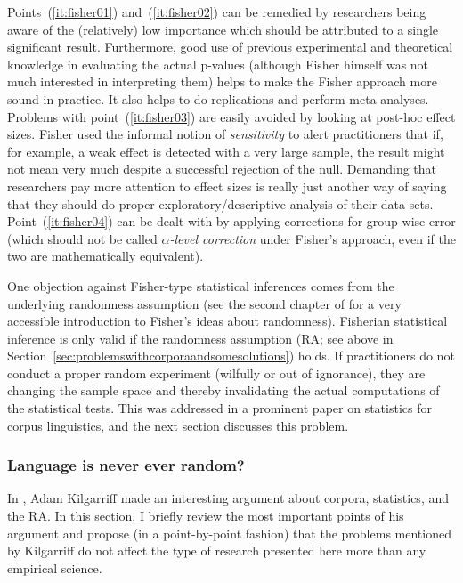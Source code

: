 Points~(\ref{it:fisher01}) and~(\ref{it:fisher02}) can be remedied by researchers being aware of the (relatively) low importance which should be attributed to a single significant result.
Furthermore, good use of previous experimental and theoretical knowledge in evaluating the actual p-values (although Fisher himself was not much interested in interpreting them) helps to make the Fisher approach more sound in practice.
It also helps to do replications and perform meta-analyses.
Problems with point~(\ref{it:fisher03}) are easily avoided by looking at post-hoc effect sizes.
Fisher used the informal notion of \textit{sensitivity} to alert practitioners that if, for example, a weak effect is detected with a very large sample, the result might not mean very much despite a successful rejection of the null.
Demanding that researchers pay more attention to effect sizes is really just another way of saying that they should do proper exploratory\slash descriptive analysis of their data sets.
Point~(\ref{it:fisher04}) can be dealt with by applying corrections for group-wise error (which should not be called \textit{$\alpha$-level correction} under Fisher's approach, even if the two are mathematically equivalent).

One objection against Fisher-type statistical inferences comes from the underlying randomness assumption (see the second chapter of \citealt{MaxwellDelaney2004} for a very accessible introduction to Fisher's ideas about randomness).
Fisherian statistical inference is only valid if the randomness assumption (RA; see above in Section~\ref{sec:problemswithcorporaandsomesolutions}) holds.
If practitioners do not conduct a proper random experiment (wilfully or out of ignorance), they are changing the sample space and thereby invalidating the actual computations of the statistical tests.
This was addressed in a prominent paper on statistics for corpus linguistics, and the next section discusses this problem.

\subsubsection{Language is never ever random?}
\label{sec:nevereverrandomfallacy}

In \citet{Kilgarriff2005}, Adam Kilgarriff made an interesting argument about corpora, statistics, and the RA.
In this section, I briefly review the most important points of his argument and propose (in a point-by-point fashion) that the problems mentioned by Kilgarriff do not affect the type of research presented here more than any empirical science.


